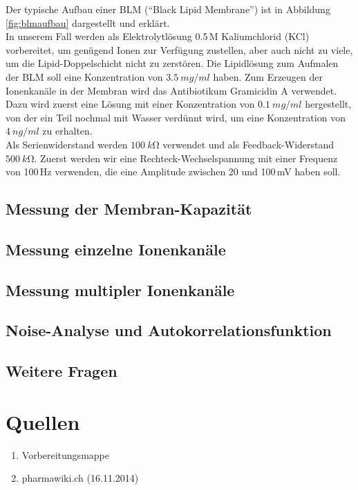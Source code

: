 \documentclass[a4paper,ngerman]{scrartcl}
\begin{document}
Der typische Aufbau einer BLM ("`Black Lipid Membrane"') ist in Abbildung \ref{fig:blmaufbau} dargestellt und erklärt. \\

In unserem Fall werden als Elektrolytlösung 0.5\,M Kaliumchlorid (KCl) vorbereitet, um genügend Ionen zur Verfügung zustellen, aber auch nicht zu viele, um die Lipid-Doppelschicht nicht zu zerstören. Die Lipidlösung zum Aufmalen der BLM soll eine Konzentration von 
$\SI{3,5}{mg/ml}$ haben. Zum Erzeugen der Ionenkanäle in der Membran wird das Antibiotikum Gramicidin A verwendet. Dazu wird zuerst eine
Lösung mit einer Konzentration von $\SI{0,1}{mg/ml}$ hergestellt, von der ein Teil nochmal mit Wasser verdünnt wird, um eine Konzentration von
$\SI{4}{ng/ml}$ zu erhalten. \\

Als Serienwiderstand werden $\SI{100}{k\ohm}$ verwendet und als Feedback-Widerstand $\SI{500}{k\ohm}$. Zuerst werden wir eine 
Rechteck-Wechselspannung mit einer Frequenz von 100\,Hz verwenden, die eine Amplitude zwischen 20 und 100\,mV haben soll.


\subsection{Messung der Membran-Kapazität}
\label{sec:capacity}

\subsection{Messung einzelne Ionenkanäle}
\label{sec:singlechannels}

\subsection{Messung multipler Ionenkanäle}
\label{sec:multiplechannels}


\subsection{Noise-Analyse und Autokorrelationsfunktion}
\label{sec:noise-autocorr}

\subsection{Weitere Fragen}
\label{sec:weitere-fragen}















\section{Quellen}
\begin{enumerate}
\item Vorbereitungsmappe \label{ref:mappe}
\item pharmawiki.ch (16.11.2014) \label{ref:pharmawiki}
\end{enumerate}
\end{document}
